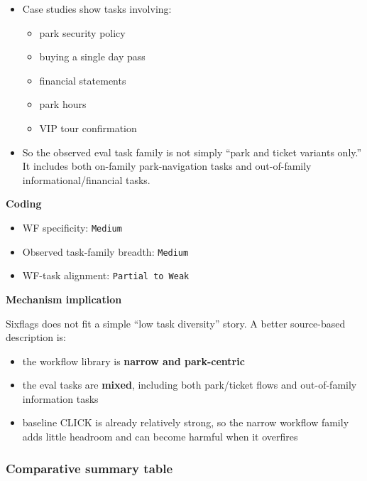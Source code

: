 \begin{itemize}
\tightlist
\item
  Case studies show tasks involving:

  \begin{itemize}
  \tightlist
  \item
    park security policy
  \item
    buying a single day pass
  \item
    financial statements
  \item
    park hours
  \item
    VIP tour confirmation
  \end{itemize}
\item
  So the observed eval task family is not simply ``park and ticket
  variants only.'' It includes both on-family park-navigation tasks and
  out-of-family informational/financial tasks.
\end{itemize}

\textbf{Coding}

\begin{itemize}
\tightlist
\item
  WF specificity: \texttt{Medium}
\item
  Observed task-family breadth: \texttt{Medium}
\item
  WF-task alignment: \texttt{Partial\ to\ Weak}
\end{itemize}

\textbf{Mechanism implication}

Sixflags does not fit a simple ``low task diversity'' story. A better
source-based description is:

\begin{itemize}
\tightlist
\item
  the workflow library is \textbf{narrow and park-centric}
\item
  the eval tasks are \textbf{mixed}, including both park/ticket flows
  and out-of-family information tasks
\item
  baseline CLICK is already relatively strong, so the narrow workflow
  family adds little headroom and can become harmful when it overfires
\end{itemize}

\subsubsection{Comparative summary
table}

